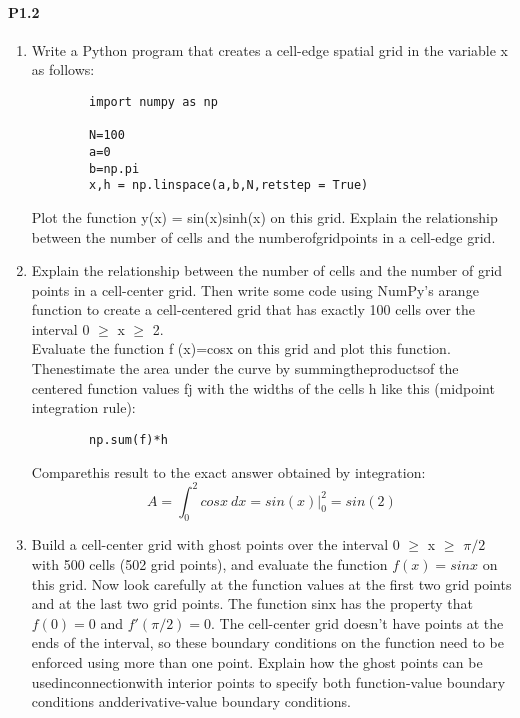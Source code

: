     \paragraph*{P1.2}
    \begin{enumerate}[label=(\alph*)]
    
      \item  Write a Python program that creates a cell-edge spatial grid in the variable x as follows: 
      \begin{lstlisting}
      	import numpy as np
      	
      	N=100
      	a=0
      	b=np.pi
      	x,h = np.linspace(a,b,N,retstep = True)
 		\end{lstlisting}
      Plot the function y(x) = sin(x)sinh(x) on this grid. Explain the relationship between the number of cells and the numberofgridpoints in a cell-edge grid.

    
     
      \item     Explain the relationship between the number of cells and the number of grid points in a cell-center grid. Then write some code using NumPy\rq s arange function to create a cell-centered grid that has exactly 100 cells over the interval 0	$\geq$ x 	$\geq$ 2. 
           \\Evaluate the function f (x)=cosx on this grid and plot this function. Thenestimate the area under the curve by summingtheproductsof the centered function values fj with the widths of the cells h like this (midpoint integration rule):
      
      \begin{lstlisting}
      	np.sum(f)*h
      \end{lstlisting}
      
      Comparethis result to the exact answer obtained by integration: 
      \\      \[A = \int_0^2 cosx \ dx = sin(x) \vert_0^2 = sin(2) \]          
       
\item Build a cell-center grid with ghost points over the interval 0 $\geq$ x $\geq$ $\pi/2$ with 500 cells (502 grid points), and evaluate the function $f (x)=sinx$ on this grid. Now look carefully at the function values at the first two grid points and at the last two grid points. The function sinx has the property that $f(0) = 0$ and $f\prime(\pi/2) = 0$. The cell-center grid doesn\rq t have points at the ends of the interval, so these boundary conditions on the function need to be enforced using more than one point. Explain how the ghost points can be usedinconnectionwith interior points to specify both function-value boundary conditions andderivative-value boundary conditions.	    
    \end{enumerate}  
    
